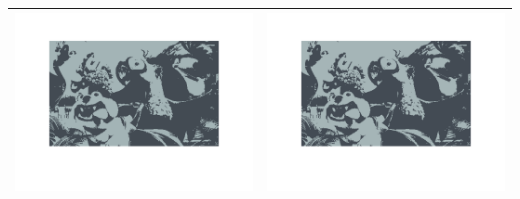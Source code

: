 \documentclass[fleqn]{article}
\begin{document}
\begin{center}
\begin{longtable}{ c | c }
	\includegraphics[scale=0.4]{./pics/task1and2/rio_k=2_random/K=2_iteration_7_random_2_rio.png} & \includegraphics[scale=0.4]{./pics/task1and2/rio_k=2_random/K=2_iteration_8_random_2_rio.png} \\\hline

\end{longtable}
\end{center}
\end{document}
